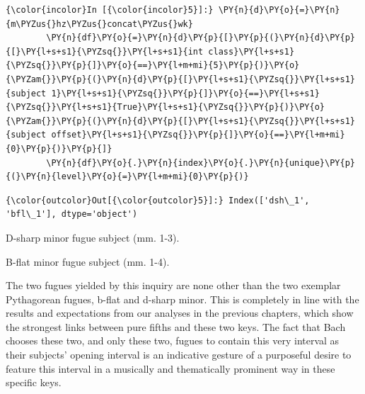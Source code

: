     \begin{Verbatim}[commandchars=\\\{\}]
{\color{incolor}In [{\color{incolor}5}]:} \PY{n}{d}\PY{o}{=}\PY{n}{m\PYZus{}hz\PYZus{}concat\PYZus{}wk}
        \PY{n}{df}\PY{o}{=}\PY{n}{d}\PY{p}{[}\PY{p}{(}\PY{n}{d}\PY{p}{[}\PY{l+s+s1}{\PYZsq{}}\PY{l+s+s1}{int class}\PY{l+s+s1}{\PYZsq{}}\PY{p}{]}\PY{o}{==}\PY{l+m+mi}{5}\PY{p}{)}\PY{o}{\PYZam{}}\PY{p}{(}\PY{n}{d}\PY{p}{[}\PY{l+s+s1}{\PYZsq{}}\PY{l+s+s1}{subject 1}\PY{l+s+s1}{\PYZsq{}}\PY{p}{]}\PY{o}{==}\PY{l+s+s1}{\PYZsq{}}\PY{l+s+s1}{True}\PY{l+s+s1}{\PYZsq{}}\PY{p}{)}\PY{o}{\PYZam{}}\PY{p}{(}\PY{n}{d}\PY{p}{[}\PY{l+s+s1}{\PYZsq{}}\PY{l+s+s1}{subject offset}\PY{l+s+s1}{\PYZsq{}}\PY{p}{]}\PY{o}{==}\PY{l+m+mi}{0}\PY{p}{)}\PY{p}{]}
        \PY{n}{df}\PY{o}{.}\PY{n}{index}\PY{o}{.}\PY{n}{unique}\PY{p}{(}\PY{n}{level}\PY{o}{=}\PY{l+m+mi}{0}\PY{p}{)}
\end{Verbatim}
\begin{Verbatim}[commandchars=\\\{\}]
{\color{outcolor}Out[{\color{outcolor}5}]:} Index(['dsh\_1', 'bfl\_1'], dtype='object')
\end{Verbatim}


\begin{Example}[H]
    \begin{center}
    \caption{ D-sharp minor fugue subject (mm. 1-3). }
    \end{center}
\end{Example}
    


\begin{Example}[H]
    \begin{center}
    \caption{ B-flat minor fugue subject (mm. 1-4). }
    \end{center}
\end{Example}
    
    The two fugues yielded by this inquiry are none other than the two
exemplar Pythagorean fugues, b-flat and d-sharp minor. This is
completely in line with the results and expectations from our analyses
in the previous chapters, which show the strongest links between pure
fifths and these two keys. The fact that Bach chooses these two, and
only these two, fugues to contain this very interval as their subjects'
opening interval is an indicative gesture of a purposeful desire to
feature this interval in a musically and thematically prominent way in
these specific keys.

